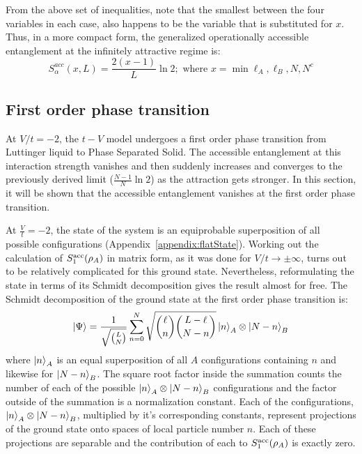 %
From the above set of inequalities, note that the smallest between the four variables in each case, also happens to be the variable that is substituted for $x$. Thus, in a more compact form, the generalized operationally accessible entanglement at the infinitely attractive regime is:
%
\begin{equation}
S_\alpha^{acc}(x,L) = \frac{2(x-1)}{L} \ln{2} ; \text{ where } x = \min{\ell_A, \ell_B, N, N^c}
\end{equation}
%
	\subsection{First order phase transition}
	
At $V/t = -2$, the $t-V$ model undergoes a first order phase transition from Luttinger liquid to Phase Separated Solid. The accessible entanglement at this interaction strength vanishes and then suddenly increases and converges to the previously derived limit ($\frac{N-1}{N}\ln{2}$) as the attraction gets stronger. In this section, it will be shown that the accessible entanglement vanishes at the first order phase transition.

At $\frac{V}{t}=-2$, the state of the system is an equiprobable superposition of all possible configurations (Appendix~\ref{appendix:flatState}). Working out the calculation of $S_1^{\rm acc}(\rho_A)$ in matrix form, as it was done for $V/t\to\pm\infty$, turns out to be relatively complicated for this ground state. Nevertheless, reformulating the state in terms of its Schmidt decomposition gives the result almost for free. The Schmidt decomposition of the ground state at the first order phase transition is:
%
\begin{equation}
\ket{\Psi} = \frac{1}{\sqrt{{{L}\choose{N}}}} \sum_{n=0}^{N} \sqrt{{{\ell}\choose{n}}{{L-\ell}\choose{N-n}}} \ket{n}_A \otimes \ket{N-n}_B
\end{equation}
%
where $\ket{n}_A$ is an equal superposition of all $A$ configurations containing $n$ and likewise for $\ket{N-n}_B$. The square root factor inside the summation counts the number of each of the possible $\ket{n}_A \otimes \ket{N-n}_B$ configurations and the factor outside of the summation is a normalization constant. Each of the configurations, $\ket{n}_A \otimes \ket{N-n}_B$, multiplied by it's corresponding constants, represent projections of the ground state onto spaces of local particle number $n$. Each of these projections are  separable and the contribution of each to $S_1^{\rm acc}(\rho_A)$ is exactly zero. 

